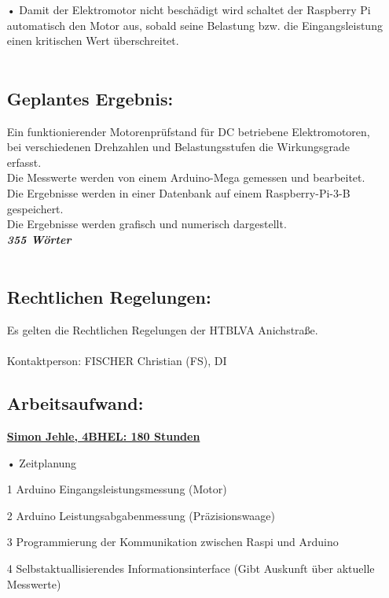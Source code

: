 \documentclass[12pt]{article}
\begin{document}
\begin{itemize}
\item[•]Damit der Elektromotor nicht beschädigt wird schaltet der Raspberry Pi automatisch den Motor aus, sobald seine Belastung bzw. die Eingangsleistung einen kritischen Wert überschreitet.\\\\         %

\subsection*{Geplantes Ergebnis:}
Ein funktionierender Motorenprüfstand für DC betriebene Elektromotoren, bei verschiedenen Drehzahlen und Belastungsstufen die Wirkungsgrade erfasst.\\
Die Messwerte werden von einem Arduino-Mega gemessen und bearbeitet. \\
Die Ergebnisse werden in einer Datenbank auf einem Raspberry-Pi-3-B gespeichert.\\
Die Ergebnisse werden grafisch und numerisch dargestellt.\\
\textit{\textbf{355 Wörter}}\\\\


\subsection*{Rechtlichen Regelungen:}
Es gelten die Rechtlichen Regelungen der HTBLVA Anichstraße.\\\\
Kontaktperson:  FISCHER Christian (FS), DI\\


\newpage
\subsection*{Arbeitsaufwand:}

\underline{\textbf{Simon Jehle, 4BHEL: 180 Stunden}}
\item[•] Zeitplanung
\item[1] Arduino Eingangsleistungsmessung (Motor) 
\item[2] Arduino Leistungsabgabenmessung (Präzisionswaage) 
\item[3] Programmierung der Kommunikation zwischen Raspi und Arduino 
\item[4] Selbstaktuallisierendes Informationsinterface (Gibt Auskunft über aktuelle Messwerte) \\\\


\end{itemize}
\end{document}
